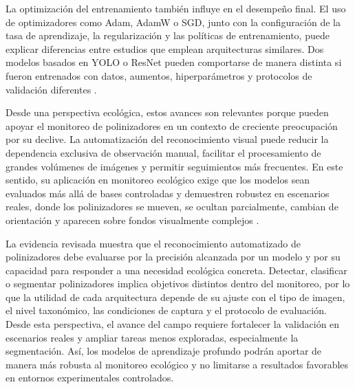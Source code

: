 La optimización del entrenamiento también influye en el desempeño final. El uso de optimizadores como Adam, AdamW o SGD, junto con la configuración de la tasa de aprendizaje, la regularización y las políticas de entrenamiento, puede explicar diferencias entre estudios que emplean arquitecturas similares. Dos modelos basados en YOLO o ResNet pueden comportarse de manera distinta si fueron entrenados con datos, aumentos, hiperparámetros y protocolos de validación diferentes \parencite{Postalcloǧlu2020, Azis2025, Sudewo2025}.

Desde una perspectiva ecológica, estos avances son relevantes porque pueden apoyar el monitoreo de polinizadores en un contexto de creciente preocupación por su declive. La automatización del reconocimiento visual puede reducir la dependencia exclusiva de observación manual, facilitar el procesamiento de grandes volúmenes de imágenes y permitir seguimientos más frecuentes. En este sentido, su aplicación en monitoreo ecológico exige que los modelos sean evaluados más allá de bases controladas y demuestren robustez en escenarios reales, donde los polinizadores se mueven, se ocultan parcialmente, cambian de orientación y aparecen sobre fondos visualmente complejos \parencite{bjerge2022tracking, hellwig2024pollinator, stark2023yolo, wittmann2024monitoring}.

La evidencia revisada muestra que el reconocimiento automatizado de polinizadores debe evaluarse por la precisión alcanzada por un modelo y por su capacidad para responder a una necesidad ecológica concreta. Detectar, clasificar o segmentar polinizadores implica objetivos distintos dentro del monitoreo, por lo que la utilidad de cada arquitectura depende de su ajuste con el tipo de imagen, el nivel taxonómico, las condiciones de captura y el protocolo de evaluación. Desde esta perspectiva, el avance del campo requiere fortalecer la validación en escenarios reales y ampliar tareas menos exploradas, especialmente la segmentación. Así, los modelos de aprendizaje profundo podrán aportar de manera más robusta al monitoreo ecológico y no limitarse a resultados favorables en entornos experimentales controlados.